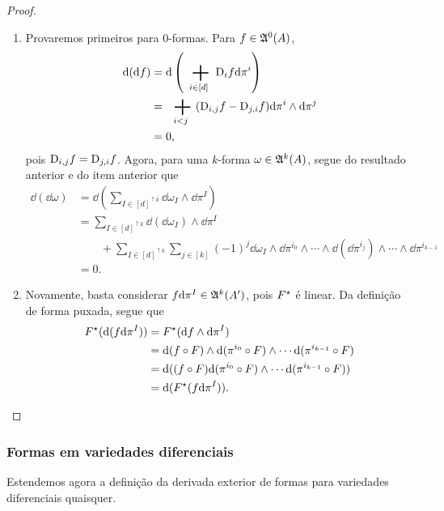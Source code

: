 \begin{proof}
\begin{enumerate}
	\item Provaremos primeiros para $0$-formas. Para $f \in \mathfrak{A}^0 (A)$,
		\begin{align*}
		\dd(\dd f) &= \dd\left( \sum_{i \in [d]} \D_i f \dd\pi^i \right) \\
			&= \sum_{i<j} (\D_{i,j} f - \D_{j,i} f) \dd\pi^i \wedge \dd\pi^j \\
			&= 0,
		\end{align*}
pois $\mathrm{D}_{i,j} f = \mathrm{D}_{j,i} f$. Agora, para uma $k$-forma $\omega \in \mathfrak{A}^k(A)$, segue do resultado anterior e do item anterior que
	\begin{align*}
	\dd(\dd \omega) &= \dd \left( \sum_{I \in [d]^{\uparrow k}} \dd \omega_I \wedge \dd\pi^I \right) \\
	&= \sum_{I \in [d]^{\uparrow k}} \dd(\dd \omega_I) \wedge \dd\pi^I \\
	&\qquad + \sum_{I \in [d]^{\uparrow k}}\sum_{j \in [k]}(-1)^j \dd \omega_I \wedge \dd\pi^{i_0} \wedge \cdots \wedge \dd(\dd\pi^{i_j}) \wedge \cdots \wedge \dd\pi^{i_{k-1}} \\
	&= 0.
	\end{align*}
	
	\item Novamente, basta considerar $f \mathrm{d}\pi^I \in \mathfrak{A}^k (A')$, pois $F^\star$ é linear. Da definição de forma puxada, segue que
		\begin{align*}
		F^\star (\mathrm{d}(f \mathrm{d}\pi^I)) &= F^\star (\mathrm{d} f \wedge \mathrm{d}\pi^I) \\
			&= \mathrm{d}(f \circ F) \wedge \mathrm{d}(\pi^{i_0} \circ F) \wedge \cdots \mathrm{d}(\pi^{i_{k-1}} \circ F) \\
			&= \mathrm{d}((f \circ F)\mathrm{d}(\pi^{i_0} \circ F) \wedge \cdots \mathrm{d}(\pi^{i_{k-1}} \circ F)) \\
			&= \mathrm{d}(F^\star(f \mathrm{d}\pi^I)).
		\end{align*}
	\end{enumerate}
\end{proof}


\subsubsection{Formas em variedades diferenciais}

Estendemos agora a definição da derivada exterior de formas para variedades diferenciais quaisquer.

